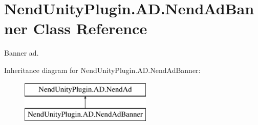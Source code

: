\hypertarget{class_nend_unity_plugin_1_1_a_d_1_1_nend_ad_banner}{}\section{Nend\+Unity\+Plugin.\+A\+D.\+Nend\+Ad\+Banner Class Reference}
\label{class_nend_unity_plugin_1_1_a_d_1_1_nend_ad_banner}


Banner ad.  


Inheritance diagram for Nend\+Unity\+Plugin.\+A\+D.\+Nend\+Ad\+Banner\+:\begin{figure}[H]
\begin{center}
\leavevmode
\includegraphics[height=2.000000cm]{class_nend_unity_plugin_1_1_a_d_1_1_nend_ad_banner}
\end{center}
\end{figure}
